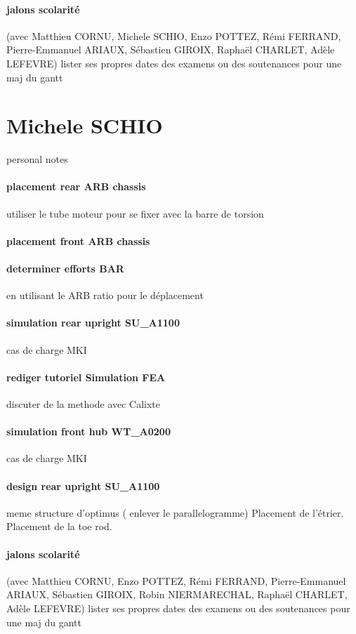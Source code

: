 \paragraph{jalons scolarité} (avec Matthieu CORNU, Michele SCHIO, Enzo POTTEZ, Rémi FERRAND, Pierre-Emmanuel ARIAUX, Sébastien GIROIX, Raphaël CHARLET, Adèle LEFEVRE) lister ses propres dates des examens ou des soutenances pour une maj du gantt

 
 \newpage \section*{Michele SCHIO} 
 \par personal notes
\paragraph{placement rear ARB chassis} utiliser le tube moteur pour se fixer avec la barre de torsion
\paragraph{placement front ARB chassis} 
\paragraph{determiner efforts BAR} en utilisant le ARB ratio pour le déplacement
\paragraph{simulation rear upright SU\_A1100} cas de charge MKI
\paragraph{rediger tutoriel Simulation FEA} discuter de la methode avec Calixte
\paragraph{simulation front hub WT\_A0200} cas de charge MKI

\paragraph{design rear upright SU\_A1100} meme structure d'optimus ( enlever le parallelogramme) Placement de l'étrier. Placement de la toe rod.

\paragraph{jalons scolarité} (avec Matthieu CORNU, Enzo POTTEZ, Rémi FERRAND, Pierre-Emmanuel ARIAUX, Sébastien GIROIX, Robin NIERMARECHAL, Raphaël CHARLET, Adèle LEFEVRE) lister ses propres dates des examens ou des soutenances pour une maj du gantt

